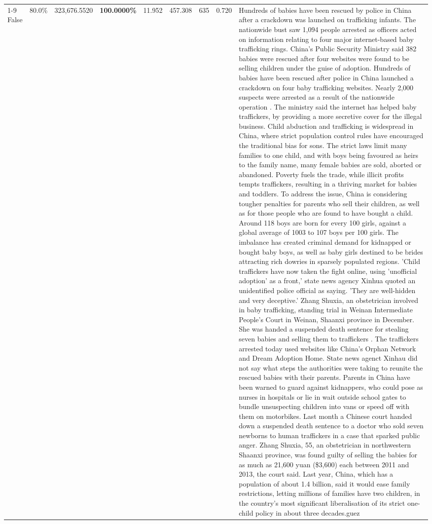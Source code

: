 \begin{table}[H]
\begin{tabular}{lllrlllll}
\cline{1-9}
False & 80.0\% & 323,676.5520 & \bfseries \color{red} 100.0000\% & 11.952 & 457.308 & 635 & 0.720 & Hundreds of babies have been rescued by police in China after a crackdown was launched on trafficking infants. The nationwide bust saw 1,094 people arrested as officers acted on information relating to four major internet-based baby trafficking rings. China's Public Security Ministry said 382 babies were rescued after four websites were found to be selling children under the guise of adoption. Hundreds of babies have been rescued after police in China launched a crackdown on four baby trafficking websites. Nearly 2,000 suspects were arrested as a result of the nationwide operation . The ministry said the internet has helped baby traffickers, by providing a more secretive cover for the illegal business. Child abduction and trafficking is widespread in China, where strict population control rules have encouraged the traditional bias for sons. The strict laws limit many families to one child, and with boys being favoured as heirs to the family name, many female babies are sold, aborted or abandoned. Poverty fuels the trade, while illicit profits tempts traffickers, resulting in a thriving market for babies and toddlers. To address the issue, China is considering tougher penalties for parents who sell their children, as well as for those people who are found to have bought a child. Around 118 boys are born for every 100 girls, against a global average of 1003 to 107 boys per 100 girls. The imbalance has created criminal demand for kidnapped or bought baby boys, as well as baby girls destined to be brides attracting rich dowries in sparsely populated regions. 'Child traffickers have now taken the fight online, using 'unofficial adoption' as a front,' state news agency Xinhua quoted an unidentified police official as saying. 'They are well-hidden and very deceptive.' Zhang Shuxia, an obstetrician involved in baby trafficking, standing trial in Weinan Intermediate People's Court in Weinan, Shaanxi province in December. She was handed a suspended death sentence for stealing seven babies and selling them to traffickers . The traffickers arrested today used websites like China's Orphan Network and Dream Adoption Home. State news agenct Xinhau did not say what steps the authorities were taking to reunite the rescued babies with their parents. Parents in China have been warned to guard against kidnappers, who could pose as nurses in hospitals or lie in wait outside school gates to bundle unsuspecting children into vans or speed off with them on motorbikes. Last month a Chinese court handed down a suspended death sentence to a doctor who sold seven newborns to human traffickers in a case that sparked public anger. Zhang Shuxia, 55, an obstetrician in northwestern Shaanxi province, was found guilty of selling the babies for as much as 21,600 yuan (\$3,600) each between 2011 and 2013, the court said. Last year, China, which has a population of about 1.4 billion, said it would ease family restrictions, letting millions of families have two children, in the country's most significant liberalisation of its strict one-child policy in about three decades.guez \\

\end{tabular}
\end{table}
